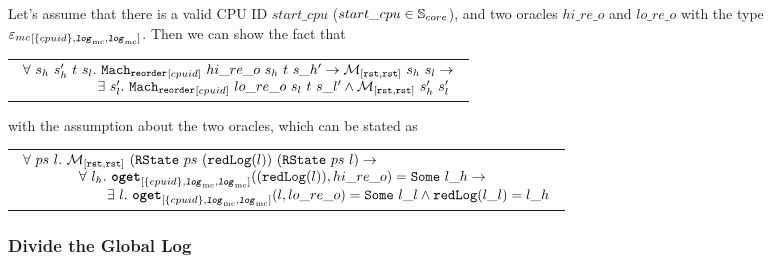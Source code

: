 \begin{lemma}
\label{lemma:chapter:conlink:reorder-refines-reorder}
Let's assume that there is a valid CPU ID $start\_cpu$ ($start\_cpu \in {\mathbb{S}_{core}}$),
and two oracles $hi\_re\_o$ and $lo\_re\_o $ with the type
${{{\varepsilon_{mc}}}_{[{\{cpuid\}}, {{{\mathrm{\texttt{\textbf{\textit{log}}}}}_{\mathrm{mc}}}}, {{{\mathrm{\texttt{\textbf{\textit{log}}}}}_{\mathrm{mc}}}}]}}$. Then we can show the fact that
\begin{center}
\begin{tabular}{P{0.95\textwidth}}
$
\begin{array}{l}
\forall \ s_h \ s_h' \ t \ s_l . \ \singlereorderstep{cpuid}{hi\_re\_o}{s_h}{t}{s\_h'} \rightarrow \matchrrstaterrstae{s_h}{s_l} \rightarrow \\
\ \ \ \ \ \ \ \ \ \ \ \ \ \ \ \ \exists\ s_l' . \  \singlereorderstep{cpuid}{lo\_re\_o}{s_l}{t}{s\_l'} \wedge  \matchrrstaterrstae{s_h'}{s_l'}\\
\end{array}
$
\end{tabular}
\end{center}
with the assumption about the two oracles, which can be stated as
\begin{center}
\begin{tabular}{P{0.95\textwidth}}
$
\begin{array}{l}
\forall \ ps \ l.\ \matchrrstaterrstae{(\rstate{ps}{(\mcreducelogfuncnoeq{l})}}{(\rstate{ps}{l})} \rightarrow \\
\ \ \ \ \ \ \ \ \ \ \ \ \forall \ l_h. \ \oget{\set{cpuid}}{\mclog}{\mclog}{(\mcreducelogfuncnoeq{l})}{hi\_re\_o}{l\_h} \rightarrow \\
\ \ \ \ \ \ \ \ \ \ \ \ \ \ \ \ \ \ \exists \ l. \ \oget{\set{cpuid}}{\mclog}{\mclog}{l}{lo\_re\_o}{l\_l} \wedge \mcreducelogfunc{l\_l}{l\_h} \\
\end{array}
$
\end{tabular}
\end{center}
\end{lemma}

\subsubsection{Divide the Global Log}

